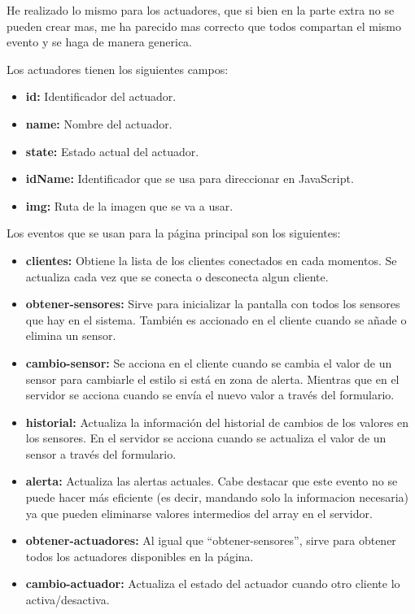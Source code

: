 \documentclass{article}
\begin{document}
He realizado lo mismo para los actuadores, que si bien en la parte extra no se pueden crear mas, me ha parecido mas correcto que todos compartan el mismo evento y se haga de manera generica.

Los actuadores tienen los siguientes campos:

\begin{itemize}
    \item \textbf{id: }Identificador del actuador.
    \item \textbf{name: }Nombre del actuador.
    \item \textbf{state: }Estado actual del actuador.
    \item \textbf{idName: }Identificador que se usa para direccionar en JavaScript.
    \item \textbf{img: }Ruta de la imagen que se va a usar.
\end{itemize}

Los eventos que se usan para la página principal son los siguientes:

\begin{itemize}
    \item \textbf{clientes: }Obtiene la lista de los clientes conectados en cada momentos. Se actualiza cada vez que se conecta o desconecta algun cliente.
    \item \textbf{obtener-sensores: }Sirve para inicializar la pantalla con todos los sensores que hay en el sistema. También es accionado en el cliente cuando se añade o elimina un sensor.
    \item \textbf{cambio-sensor: }Se acciona en el cliente cuando se cambia el valor de un sensor para cambiarle el estilo si está en zona de alerta. Mientras que en el servidor se acciona cuando se envía el nuevo valor a través del formulario.
    \item \textbf{historial: }Actualiza la información del historial de cambios de los valores en los sensores. En el servidor se acciona cuando se actualiza el valor de un sensor a través del formulario.
    \item \textbf{alerta: }Actualiza las alertas actuales. Cabe destacar que este evento no se puede hacer más eficiente (es decir, mandando solo la informacion necesaria) ya que pueden eliminarse valores intermedios del array en el servidor.
    \item \textbf{obtener-actuadores: }Al igual que ``obtener-sensores'', sirve para obtener todos los actuadores disponibles en la página.
    \item \textbf{cambio-actuador: }Actualiza el estado del actuador cuando otro cliente lo activa/desactiva.
\end{itemize}
\end{document}
